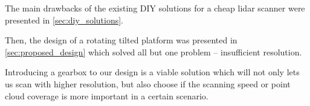 The main drawbacks of the existing DIY solutions for a cheap \gls{lidar} scanner were presented in \cref{sec:diy_solutions}.

Then, the design of a rotating tilted platform was presented in \cref{sec:proposed_design} which solved all but one problem -- insufficient resolution.

Introducing a gearbox to our design is a viable solution which will not only lets us scan with higher resolution, 
but also choose if the scanning speed or point cloud coverage is more important in a certain scenario.
